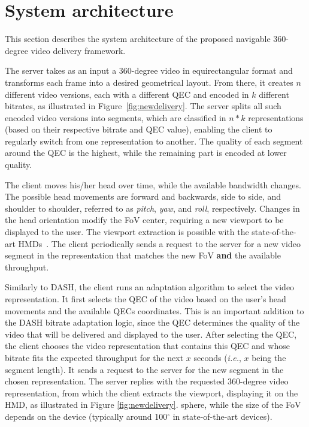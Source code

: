 \section{System architecture}

This section describes the system architecture of the proposed
navigable 360-degree video delivery framework.

 The server takes as an input a 360-degree video in
equirectangular format and transforms each frame into a desired
geometrical layout. From there, it creates $n$ different video
versions, each with a different QEC and encoded in $k$ different
bitrates, as illustrated in Figure~\ref{fig:newdelivery}.
 The server splits all such encoded video
versions into segments, which are classified in $n*k$ representations
(based on their respective bitrate and QEC value), enabling the client
to regularly switch from one representation to another. The quality of
each segment around the QEC is the highest, while the remaining part
is encoded at lower quality.

 The client moves his/her head over time, while the
available bandwidth changes. The possible head movements are forward
and backwards, side to side, and shoulder to shoulder, referred to as
\emph{pitch}, \emph{yaw}, and \emph{roll}, respectively. Changes in
the head orientation modify the FoV center, requiring a new viewport
to be displayed to the user. The viewport extraction is possible with
the state-of-the-art HMDs~\cite{fovhmds}. The client periodically
sends a request to the server for a new video segment in the
representation that matches the new FoV \textbf{and} the available
throughput.

 Similarly to DASH, the client runs an
adaptation algorithm to select the video representation. It first
selects the QEC of the video based on the user's head movements and
the available QECs coordinates. This is an important addition to the
DASH bitrate adaptation logic, since the QEC determines the quality of
the video that will be delivered and displayed to the user. After
selecting the QEC, the client chooses the video representation that
contains this QEC and whose bitrate fits the expected throughput for
the next $x$ seconds (\textit{i.e.}, $x$ being the segment length). It
sends a request to the server for the new segment in the chosen
representation. The server replies with the requested 360-degree video
representation, from which the client extracts the viewport,
displaying it on the HMD, as illustrated in Figure
\ref{fig:newdelivery}. %
sphere, while the size of the FoV depends on the device (typically
around 100$^\circ$ in state-of-the-art devices).

